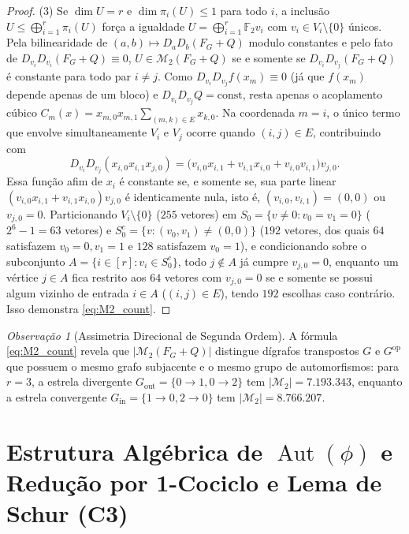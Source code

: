 \documentclass[11pt,a4paper]{article}
\theoremstyle{definition}
\theoremstyle{remark}
\newtheorem{remark}[theorem]{Observação}
\newcommand{\F}{\mathbb{F}_2}
\newcommand{\Aut}{\operatorname{Aut}}
\begin{document}
\begin{proof}
(3) Se $\dim U = r$ e $\dim\pi_i(U) \le 1$ para todo $i$, a inclusão $U \le \bigoplus_{i=1}^r \pi_i(U)$ força a igualdade $U = \bigoplus_{i=1}^r \F v_i$ com $v_i \in V_i \setminus \{0\}$ únicos. Pela bilinearidade de $(a,b) \mapsto D_a D_b(F_G+Q)$ modulo constantes e pelo fato de $D_{v_i}D_{v_i}(F_G+Q) \equiv 0$, $U \in \mathcal{M}_2(F_G+Q)$ se e somente se $D_{v_i}D_{v_j}(F_G+Q)$ é constante para todo par $i \neq j$. Como $D_{v_i}D_{v_j}f(x_m) \equiv 0$ (já que $f(x_m)$ depende apenas de um bloco) e $D_{v_i}D_{v_j}Q = \mathrm{const}$, resta apenas o acoplamento cúbico $C_m(x) = x_{m,0}x_{m,1}\sum_{(m,k)\in E} x_{k,0}$. Na coordenada $m=i$, o único termo que envolve simultaneamente $V_i$ e $V_j$ ocorre quando $(i,j) \in E$, contribuindo com
\[
  D_{v_i}D_{v_j}(x_{i,0}x_{i,1}x_{j,0}) = \big(v_{i,0}x_{i,1} + v_{i,1}x_{i,0} + v_{i,0}v_{i,1}\big) v_{j,0}.
\]
Essa função afim de $x_i$ é constante se, e somente se, sua parte linear $(v_{i,0}x_{i,1} + v_{i,1}x_{i,0})v_{j,0}$ é identicamente nula, isto é, $(v_{i,0},v_{i,1}) = (0,0)$ ou $v_{j,0} = 0$. Particionando $V_i \setminus \{0\}$ ($255$ vetores) em $S_0 = \{v \neq 0 : v_0 = v_1 = 0\}$ ($2^6 - 1 = 63$ vetores) e $S_0^c = \{v : (v_0,v_1) \neq (0,0)\}$ ($192$ vetores, dos quais $64$ satisfazem $v_0=0, v_1=1$ e $128$ satisfazem $v_0=1$), e condicionando sobre o subconjunto $A = \{i \in [r] : v_i \in S_0^c\}$, todo $j \notin A$ já cumpre $v_{j,0}=0$, enquanto um vértice $j \in A$ fica restrito aos $64$ vetores com $v_{j,0}=0$ se e somente se possui algum vizinho de entrada $i \in A$ ($(i,j) \in E$), tendo $192$ escolhas caso contrário. Isso demonstra \eqref{eq:M2_count}.
\end{proof}

\begin{remark}[Assimetria Direcional de Segunda Ordem]
A fórmula \eqref{eq:M2_count} revela que $|\mathcal{M}_2(F_G+Q)|$ distingue dígrafos transpostos $G$ e $G^{\mathrm{op}}$ que possuem o mesmo grafo subjacente e o mesmo grupo de automorfismos: para $r=3$, a estrela divergente $G_{\mathrm{out}} = \{0\to 1, 0\to 2\}$ tem $|\mathcal{M}_2| = 7.193.343$, enquanto a estrela convergente $G_{\mathrm{in}} = \{1\to 0, 2\to 0\}$ tem $|\mathcal{M}_2| = 8.766.207$.
\end{remark}

\vspace{8pt}
\section{Estrutura Algébrica de $\Aut(\phi)$ e Redução por 1-Cociclo e Lema de Schur (C3)}
\end{document}
